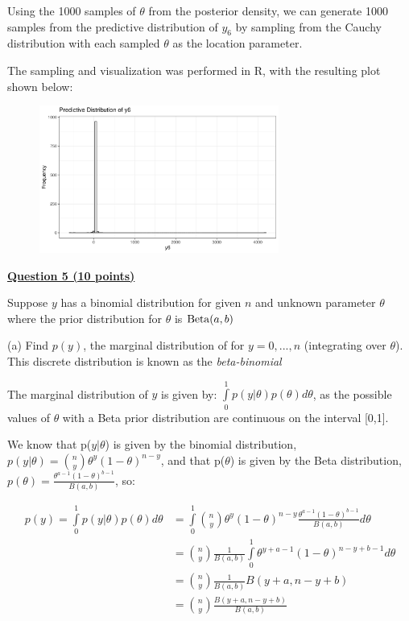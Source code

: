 \documentclass[12pt]{article}
\begin{document}
Using the 1000 samples of $\theta$ from the posterior density, we can generate 1000 samples from the predictive distribution of $y_6$ by sampling from the Cauchy distribution with each sampled $\theta$ as the location parameter.

The sampling and visualization was performed in R, with the resulting plot shown below:

\begin{figure}[h]
    \centering
    \includegraphics[width=0.7\textwidth]{q4c_plot.pdf}
\end{figure}

\pagebreak

{\underline{\bf Question 5 (10 points)}}  

Suppose $y$ has a binomial distribution for given $n$ and unknown parameter $\theta$ where the prior distribution for $\theta$ is ${\rm Beta} (a,b)$

(a) Find $p(y)$, the marginal distribution of for $y = 0, . . . , n$ (integrating over $\theta$).  This discrete distribution is known as the {\it beta-binomial}

The marginal distribution of $y$ is given by:
$\int\limits_0^1 p(y | \theta)p(\theta) d\theta$, as the possible values of $\theta$ with a Beta 
prior distribution are continuous on the interval [0,1].

We know that p($y | \theta$) is given by the binomial distribution, $p(y | \theta) = \binom{n}{y}\theta^y(1 - \theta)^{n-y}$, and
that p($\theta$) is given by the Beta distribution, $p(\theta) = \frac{\theta^{a-1}(1 - \theta)^{b-1}}{B(a,b)}$, so:

\begin{align*}
p(y) = \int\limits_0^1 p(y | \theta)p(\theta) d\theta &= \int\limits_0^1\binom{n}{y}\theta^y(1 - \theta)^{n-y}\frac{\theta^{a-1}(1 - \theta)^{b-1}}{B(a,b)}d\theta \\
&= \binom{n}{y}\frac{1}{B(a,b)}\int\limits_0^1\theta^{y + a - 1}(1 - \theta)^{n - y + b - 1}d\theta \\
&= \binom{n}{y}\frac{1}{B(a,b)}B(y + a, n - y + b) \\
&= \binom{n}{y}\frac{B(y + a, n - y + b)}{B(a,b)} \\
\end{align*}
\end{document}
